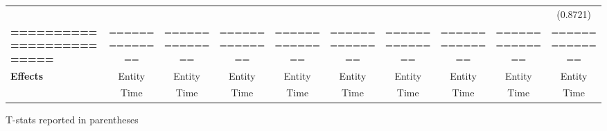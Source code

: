 \begin{center}
\begin{tabular}{lccccccccc}
\textbf{ }                         &                &                  &                  &                  &                  &                  &                  &                  &     (0.8721)      \\
\textbf{=========================} & ============== &  ==============  &  ==============  &  ==============  &  ==============  &  ==============  &  ==============  &  ==============  &  ==============   \\
\textbf{Effects}                   &     Entity     &      Entity      &      Entity      &      Entity      &      Entity      &      Entity      &      Entity      &      Entity      &      Entity       \\
\textbf{}                          &      Time      &       Time       &       Time       &       Time       &       Time       &       Time       &       Time       &       Time       &       Time        \\
\bottomrule
\end{tabular}
\end{center}

T-stats reported in parentheses